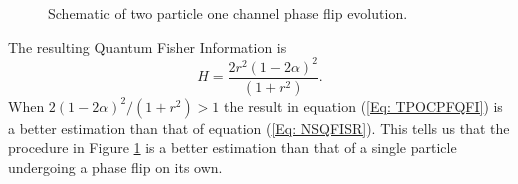 \documentclass[twocolumn]{article}
\begin{document}
\begin{figure}[ht]
    \caption{\footnotesize{Schematic of two particle one channel phase flip evolution.}}
    \label{Fig: TPPF}
\end{figure}
\par \noindent
The resulting Quantum Fisher Information is
\begin{equation}\label{Eq: TPOCPFQFI}
H=\frac{2r^2(1-2\alpha)^2}{(1+r^2)}.
\end{equation}
When $2(1-2\alpha)^2/(1+r^2)>1$ the result in equation (\ref{Eq: TPOCPFQFI}) is a better estimation than that of equation (\ref{Eq: NSQFISR}). This tells us that the procedure in Figure \ref{Fig: TPPF} is a better estimation than that of a single particle undergoing a phase flip on its own.
\end{document}
